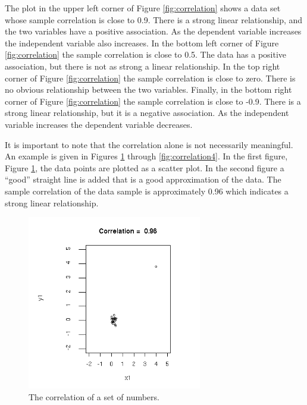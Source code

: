 \documentclass[12pt]{article}
\begin{document}
The plot in the upper left corner of Figure \ref{fig:correlation}
shows a data set whose sample correlation is close to 0.9. There is a
strong linear relationship, and the two variables have a positive
association. As the dependent variable increases the independent
variable also increases. In the bottom left corner of Figure
\ref{fig:correlation} the sample correlation is close to 0.5.  The
data has a positive association, but there is not as strong a linear
relationship. In the top right corner of Figure \ref{fig:correlation}
the sample correlation is close to zero. There is no obvious
relationship between the two variables. Finally, in the bottom right
corner of Figure \ref{fig:correlation} the sample correlation is close
to -0.9. There is a strong linear relationship, but it is a negative
association. As the independent variable increases the dependent
variable decreases.



It is important to note that the correlation alone is not necessarily
meaningful.  An example is given in Figures \ref{fig:correlation1}
through \ref{fig:correlation4}. In the first figure, Figure
\ref{fig:correlation1}, the data points are plotted as a scatter plot.
In the second figure a ``good'' straight line is added that is a good
approximation of the data. The sample correlation of the data sample
is approximately 0.96 which indicates a strong linear relationship.

\begin{figure}[tb]
  \centerline{\includegraphics[height=3in]{correlation1}}
  \caption{The correlation of a set of numbers.}
  \label{fig:correlation1}
\end{figure}
\end{document}
